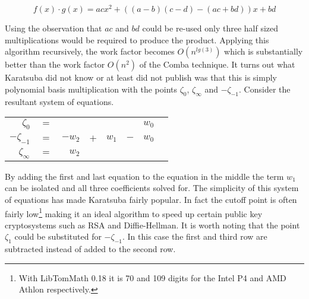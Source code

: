 \documentclass[b5paper]{book}
\begin{document}
\begin{equation}
f(x) \cdot g(x) = acx^2 + ((a - b)(c - d) - (ac + bd))x + bd
\end{equation}

Using the observation that $ac$ and $bd$ could be re-used only three half sized multiplications would be required to produce the product.  Applying
this algorithm recursively, the work factor becomes $O(n^{lg(3)})$ which is substantially better than the work factor $O(n^2)$ of the Comba technique.  It turns 
out what Karatsuba did not know or at least did not publish was that this is simply polynomial basis multiplication with the points 
$\zeta_0$, $\zeta_{\infty}$ and $-\zeta_{-1}$.  Consider the resultant system of equations.

\begin{center}
\begin{tabular}{rcrcrcrc}
$\zeta_{0}$ &      $=$ &  &  &  & & $w_0$ \\
$-\zeta_{-1}$ &    $=$ & $-w_2$ & $+$ & $w_1$ & $-$ & $w_0$ \\
$\zeta_{\infty}$ & $=$ & $w_2$ &  & &  & \\
\end{tabular}
\end{center}

By adding the first and last equation to the equation in the middle the term $w_1$ can be isolated and all three coefficients solved for.  The simplicity
of this system of equations has made Karatsuba fairly popular.  In fact the cutoff point is often fairly low\footnote{With LibTomMath 0.18 it is 70 and 109 digits for the Intel P4 and AMD Athlon respectively.}
making it an ideal algorithm to speed up certain public key cryptosystems such as RSA and Diffie-Hellman.  It is worth noting that the point 
$\zeta_1$ could be substituted for $-\zeta_{-1}$.  In this case the first and third row are subtracted instead of added to the second row.  
\end{document}
